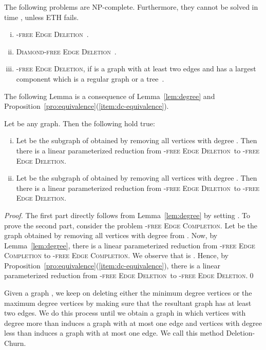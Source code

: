 \documentclass[envcountsame,envcountsect,10pt,oribibl]{llncs}
\newcommand{\pname}[1]{\textnormal{\textsc{#1}}}
\newcommand{\cclass}[1]{\textnormal{\textsf{#1}}}
\newcommand{\HED}{\pname{-free Edge Deletion}}
\newcommand{\HDED}{\pname{-free Edge Deletion}}
\newcommand{\HBEC}{\pname{-free Edge Completion}}
\newcommand{\PTED}{\pname{-free Edge Deletion}}
\newcommand{\DED}{\pname{Diamond-free Edge Deletion}}
\newcommand{\NPC}{\cclass{NP-complete}}
\begin{document}
\begin{proposition}
  \label{pro:deletion-base}
  The following problems are \NPC. Furthermore, they cannot be 
  solved in time , unless ETH fails.
  \begin{enumerate}[(i)]
  \item\label{item:deletion-p3} \PTED~\cite{komusiewicz2012cluster}.
  \item\label{item:deletion-diamond} \DED~\cite{DBLP:journals/disopt/FellowsGKNU11,DBLP:conf/ipec/SandeepS15}.
  \item\label{item:deletion-tree-reg} \HED, if  is a graph with at least two edges and
    has a largest component which is a regular graph or a tree~\cite{DBLP:conf/cocoa/AravindSS15}.
  \end{enumerate}
\end{proposition}

The following Lemma is a consequence of Lemma~\ref{lem:degree} and Proposition~\ref{pro:equivalence}(\ref{item:dc-equivalence}).

\begin{lemma}
  \label{lem:rotate}
  Let  be any graph. Then the following hold true:
  \begin{enumerate}[(i)]
  \item Let  be the subgraph of  obtained by removing all
    vertices with degree .
    Then there is a linear parameterized reduction from \HDED\ to \HED.
  \item Let  be the subgraph of  obtained by removing all
    vertices with degree .
    Then there is a linear parameterized reduction from \HDED\ to \HED. 
  \end{enumerate}
\end{lemma}
\begin{proof}
  The first part directly follows from Lemma~\ref{lem:degree} by setting .
  To prove the second part, consider the problem \HBEC. 
  Let  be the graph obtained by removing all vertices with degree  from . 
  Now, by Lemma~\ref{lem:degree},
  there is a linear parameterized reduction from \textsc{-free Edge Completion} to \HBEC.
  We observe that  is . Hence, by Proposition~\ref{pro:equivalence}(\ref{item:dc-equivalence}),
  there is a linear parameterized reduction from \HDED\ to \HED.\qed
\end{proof}

Given a graph , we keep on deleting either the minimum degree vertices or the 
maximum degree vertices by making sure that the resultant graph has at least 
two edges. We do this process until we obtain a graph
in which vertices with degree more than  induces a graph with 
at most one edge and vertices with degree less than  induces
a graph with at most one edge. We call this method Deletion-Churn.
\end{document}
